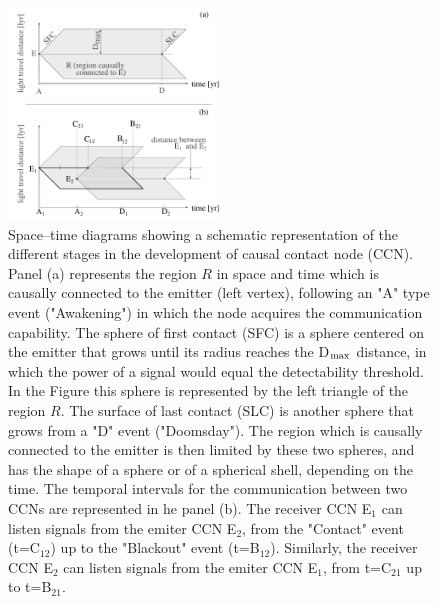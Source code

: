 \documentclass[crop]{CSLB}
\newcommand{\ceti}{CCN}
\newcommand{\cetis}{CCNs}
\begin{document}
\begin{figure}[!t]
   \centering
   \includegraphics[width=0.5\textwidth]{F_scheme.pdf}
   \caption{
Space--time diagrams showing a schematic representation of the
different stages in the development of causal contact node (\ceti{}).
%
Panel (a) represents the region $R$ in space and time which is causally
connected to the emitter (left vertex), following an "A" type event
("Awakening") in which the node acquires the communication capability.
%
The sphere of first contact (SFC) is a sphere centered on the emitter
that grows until its radius reaches the D$_{\rm max}$ distance, in which
the power of a signal would equal the detectability threshold.
%
In the Figure this sphere is represented by the left triangle of the
region $R$.
%
The surface of last contact (SLC) is another sphere that grows from a
"D" event ("Doomsday").
%
The region which is causally connected to the emitter is then limited
by these two spheres, and has the shape of a sphere or of a spherical
shell, depending on the time.
%
The temporal intervals for
the communication between two \cetis{} are represented in he
panel (b).
%
The receiver \ceti{} E$_1$ can listen signals from the emiter \ceti{} E$_2$,
from the "Contact" event (t=C$_{12}$) up to the "Blackout" event (t=B$_{12}$).
%
Similarly, 
the receiver \ceti{} E$_2$ can listen signals from the emiter \ceti{} E$_1$,
from t=C$_{21}$ up to t=B$_{21}$. 
%
   } \label{F_scheme}
\end{figure}



\end{document}
